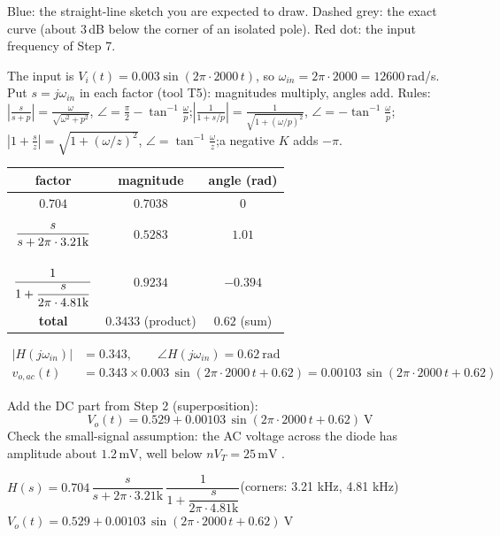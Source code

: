 \documentclass[11pt]{article}
\newcommand{\solstep}[2]{\par\medskip{\color{stepc}\textbf{Step #1 --- #2}}\par\nopagebreak}
\begin{document}
{\small Blue: the straight-line sketch you are expected to draw. Dashed grey: the exact curve (about 3\,dB below the corner of an isolated pole). Red dot: the input frequency of Step 7.}
\solstep{7}{Total output (DC + AC)}The input is $V_i(t) = 0.003\sin\left(2\pi\cdot 2000\,t\right)$, so $\omega_{in} = 2\pi\cdot 2000 = 12600$\,rad/s. Put $s=j\omega_{in}$ in each factor (tool T5): magnitudes multiply, angles add.
{\small Rules: $\left|\frac{s}{s+p}\right| = \frac{\omega}{\sqrt{\omega^2+p^2}}$, $\angle = \frac{\pi}{2}-\tan^{-1}\frac{\omega}{p}$;\quad $\left|\frac{1}{1+s/p}\right| = \frac{1}{\sqrt{1+(\omega/p)^2}}$, $\angle = -\tan^{-1}\frac{\omega}{p}$;\quad $\left|1+\frac{s}{z}\right| = \sqrt{1+(\omega/z)^2}$, $\angle = \tan^{-1}\frac{\omega}{z}$;\quad a negative $K$ adds $-\pi$.}
\begin{center}\renewcommand{\arraystretch}{1.35}
\begin{tabular}{ccc}
\toprule
factor & magnitude & angle (rad) \\
\midrule
$0.704$ & $0.7038$ & $0$ \\
$\rule[-1.1em]{0pt}{2.8em}\dfrac{s}{s+2\pi\cdot 3.21\mathrm{k}}$ & $0.5283$ & $1.01$ \\
$\rule[-1.7em]{0pt}{4em}\dfrac{1}{1+\dfrac{s}{2\pi\cdot 4.81\mathrm{k}}}$ & $0.9234$ & $-0.394$ \\
\textbf{total} & $\mathbf{0.3433}$ (product) & $\mathbf{0.62}$ (sum) \\
\bottomrule
\end{tabular}\end{center}

\begin{align*}
|H(j\omega_{in})| &= 0.343, \qquad \angle H(j\omega_{in}) = 0.62\ \mathrm{rad} \\
v_{o,ac}(t) &= 0.343\times 0.003\,\sin\left(2\pi\cdot 2000\,t + 0.62\right) = 0.00103\,\sin\left(2\pi\cdot 2000\,t + 0.62\right)
\end{align*}

Add the DC part from Step 2 (superposition):
\[
\boxed{V_o(t) = 0.529 + 0.00103\,\sin\left(2\pi\cdot 2000\,t + 0.62\right)\ \mathrm{V}}
\]
 Check the small-signal assumption: the AC voltage across the diode has amplitude about $1.2\,\mathrm{m}\mathrm{V}$, well below $nV_T = 25\,\mathrm{m}\mathrm{V}$ \checkmark.
\begin{ansbox}
$H(s) = 0.704\,\dfrac{s}{s+2\pi\cdot 3.21\mathrm{k}}\,\dfrac{1}{1+\dfrac{s}{2\pi\cdot 4.81\mathrm{k}}}$\quad (corners: 3.21 kHz, 4.81 kHz)\\[4pt]
$V_o(t) = 0.529 + 0.00103\,\sin\left(2\pi\cdot 2000\,t + 0.62\right)\ \mathrm{V}$
\end{ansbox}
\end{document}
